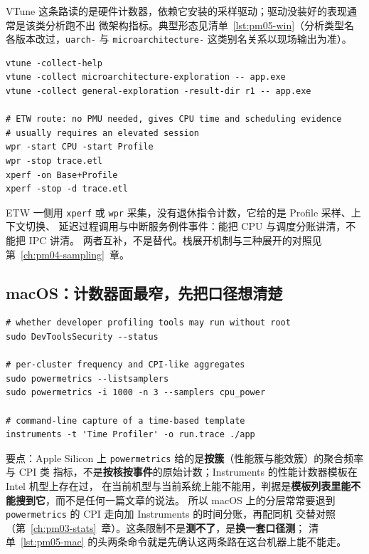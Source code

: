 \documentclass[12pt,a4paper,fontset=fandol]{ctexbook}
\newcommand{\Tp}[1]{\texttt{#1}}
\newcommand{\Lang}[1]{\textsf{#1}}
\newcommand{\MCpu}{\Lang{CPU}}
\newcommand{\Mx}[1]{\textsf{#1}}
\begin{document}
VTune 这条路读的是硬件计数器，依赖它安装的采样驱动；驱动没装好的表现通常是该类分析跑不出
微架构指标。典型形态见清单~\ref{lst:pm05-win}（分析类型名各版本改过，\Tp{uarch-} 与
\Tp{microarchitecture-} 这类别名关系以现场输出为准）。

\begin{lstlisting}[style=shellstyle, label={lst:pm05-win},
  title={Windows 侧形态示意（命令行以本机 vtune -h 为准）}]
vtune -collect-help
vtune -collect microarchitecture-exploration -- app.exe
vtune -collect general-exploration -result-dir r1 -- app.exe

# ETW route: no PMU needed, gives CPU time and scheduling evidence
# usually requires an elevated session
wpr -start CPU -start Profile
wpr -stop trace.etl
xperf -on Base+Profile
xperf -stop -d trace.etl
\end{lstlisting}

ETW 一侧用 \Tp{xperf} 或 \Tp{wpr} 采集，没有退休指令计数，它给的是 Profile 采样、上下文切换、
延迟过程调用与中断服务例件事件：能把 \MCpu{} 与调度分账讲清，不能把 \Mx{IPC} 讲清。
两者互补，不是替代。栈展开机制与三种展开的对照见第~\ref{ch:pm04-sampling}~章。

\subsection*{macOS：计数器面最窄，先把口径想清楚}

\begin{lstlisting}[style=shellstyle, label={lst:pm05-mac},
  title={macOS 侧形态示意（字段名随机型与系统版本变）}]
# whether developer profiling tools may run without root
sudo DevToolsSecurity --status

# per-cluster frequency and CPI-like aggregates
sudo powermetrics --listsamplers
sudo powermetrics -i 1000 -n 3 --samplers cpu_power

# command-line capture of a time-based template
instruments -t 'Time Profiler' -o run.trace ./app
\end{lstlisting}

要点：Apple Silicon 上 \Tp{powermetrics} 给的是\textbf{按簇}（性能簇与能效簇）的聚合频率与 CPI 类
指标，不是\textbf{按核按事件}的原始计数；Instruments 的性能计数器模板在 Intel 机型上存在过，
在当前机型与当前系统上能不能用，判据是\textbf{模板列表里能不能搜到它}，而不是任何一篇文章的说法。
所以 macOS 上的分层常常要退到 \Tp{powermetrics} 的 CPI 走向加 Instruments 的时间分账，再配同机
交替对照（第~\ref{ch:pm03-stats}~章）。这条限制不是\textbf{测不了}，是\textbf{换一套口径测}；
清单~\ref{lst:pm05-mac} 的头两条命令就是先确认这两条路在这台机器上能不能走。
\end{document}
